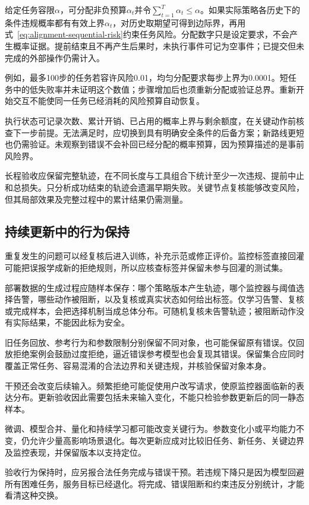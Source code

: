 给定任务容限$\alpha$，可分配非负预算$\alpha_t$并令$\sum_{t=1}^{T}\alpha_t\leq\alpha$。如果实际策略各历史下的条件违规概率都有有效上界$\alpha_t$，对历史取期望可得到边际界，再用式~\eqref{eq:alignment-sequential-risk}约束任务风险。分配数字只是设定要求，不会产生概率证据。提前结束且不再产生后果时，未执行事件可记为空事件；已提交但未完成的外部操作仍需计入。

例如，最多100步的任务若容许风险0.01，均匀分配要求每步上界为0.0001。短任务中的低失败率并未证明这个数值；步骤增加后也须重新分配或验证总界。重新开始交互不能使同一任务已经消耗的风险预算自动恢复。

执行状态可记录次数、累计开销、已占用的概率上界与剩余额度，在关键动作前核查下一步前提。无法满足时，应切换到具有明确安全条件的后备方案；新路线更短也仍需验证。未观察到错误不会补回已经分配的概率预算，因为预算描述的是事前风险界。

长程验收应保留完整轨迹，在不同长度与工具组合下统计至少一次违规、提前中止和总损失。只分析成功结束的轨迹会遗漏早期失败。关键节点复核能够改变风险，但其局部效果及完整过程中的累计结果仍需测量。

\subsection{持续更新中的行为保持}
\label{sec:alignment-generalization-update}

重复发生的问题可以经复核后进入训练，补充示范或修正评价。监控标签直接回灌可能把误报学成新的拒绝规则，所以应核查标签并保留未参与回灌的测试集。

部署数据的生成过程应随样本保存：哪个策略版本产生轨迹，哪个监控器与阈值选择告警，哪些动作被阻断，以及复核或真实状态如何给出标签。仅学习告警、复核或完成样本，会把选择机制当成总体分布。可随机复核未告警轨迹；被阻断动作没有实际结果，不能因此标为安全。

旧任务回放、参考行为和参数限制分别保留不同对象，也可能保留原有错误。仅回放拒绝案例会鼓励过度拒绝，逼近错误参考模型也会复现其错误。保留集合应同时覆盖正常任务、容易混淆的合法边界和关键违规，并核验保留对象本身。

干预还会改变后续输入。频繁拒绝可能促使用户改写请求，使原监控器面临新的表达分布。更新验收因此需要包括未来输入变化，不能只检验参数更新后的同一静态样本。

微调、模型合并、量化和持续学习都可能改变关键行为。参数变化小或平均能力不变，仍允许少量高影响场景退化。每次更新应成对比较旧任务、新任务、关键边界及监控表现，并保留版本以支持定位。

验收行为保持时，应另报合法任务完成与错误干预。若违规下降只是因为模型回避所有困难任务，服务目标已经退化。将完成、错误阻断和约束违反分别统计，才能看清这种交换。

